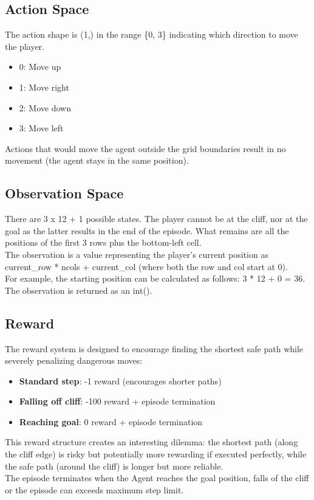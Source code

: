 \documentclass[a4paper,12pt]{article}
\begin{document}
\subsection{Action Space}
The action shape is (1,) in the range \{0, 3\} indicating which direction to move the player.
\begin{itemize}
    \item 0: Move up
    \item 1: Move right
    \item 2: Move down
    \item 3: Move left
\end{itemize}
Actions that would move the agent outside the grid boundaries result in no movement (the agent stays in the same position).
\subsection{Observation Space}
There are 3 x 12 + 1 possible states. The player cannot be at the cliff, nor at the goal as the latter results in the end of the episode. What remains are all the positions of the first 3 rows plus the bottom-left cell.
\vspace{0,5cm}\\
The observation is a value representing the player’s current position as current\_row * ncols + current\_col (where both the row and col start at 0).\\For example, the starting position can be calculated as follows: 3 * 12 + 0 = 36.
\vspace{0,5cm}\\
The observation is returned as an int().
\subsection{Reward}
The reward system is designed to encourage finding the shortest safe path while severely penalizing dangerous moves:
\begin{itemize}
    \item \textbf{Standard step}: -1 reward (encourages shorter paths)
    \item \textbf{Falling off cliff}: -100 reward + episode termination
    \item \textbf{Reaching goal}: 0 reward + episode termination
\end{itemize}
This reward structure creates an interesting dilemma: the shortest path (along the cliff edge) is risky but potentially more rewarding if executed perfectly, while the safe path (around the cliff) is longer but more reliable.
\vspace{0,5cm}\\
The episode terminates when the Agent reaches the goal position, falls of the cliff or the episode can exceeds maximum step limit.
\end{document}
